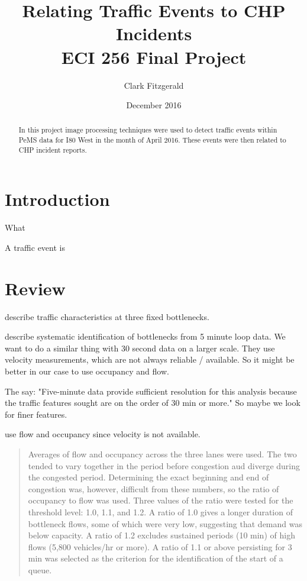 \documentclass[12pt]{article}
\begin{document}
\title{Relating Traffic Events to CHP Incidents\\
ECI 256 Final Project}
\date{December 2016}
\author{Clark Fitzgerald}
\maketitle

\begin{abstract}

In this project image processing techniques were used to detect traffic
events within PeMS data for I80 West in the month of April 2016. 
These events were then related to CHP incident reports.

\end{abstract}

\section{Introduction}

What 

A traffic event is 

\section{Review}

\cite{chung2007relation} describe traffic characteristics at three fixed bottlenecks.

\cite{chen2004systematic} describe systematic identification of bottlenecks from 5
minute loop data. We want to do a similar thing with 30 second data on a larger scale.
They use velocity measurements, which are not always reliable / available. So it might be 
better in our case to use occupancy and flow.

The say: "Five-minute data provide sufficient
resolution for this analysis because the traffic features sought are on
the order of 30 min or more." So maybe we look for finer features.

\cite{hall1991freeway} use flow and occupancy since velocity is not available.

\begin{quote}
Averages of flow and occupancy across the three lanes were
used. The two tended to vary together in the period before
congestion aud diverge during the congested period. Determining
the exact beginning and end of congestion was,
however, difficult from these numbers, so the ratio of occupancy
to flow was used. Three values of the ratio were tested
for the threshold level: 1.0, 1.1, and 1.2. A ratio of 1.0 gives
a longer duration of bottleneck flows, some of which were
very low, suggesting that demand was below capacity. A ratio
of 1.2 excludes sustained periods (10 min) of high flows (5,800
vehicles/hr or more). A ratio of 1.1 or above persisting for 3
min was selected as the criterion for the identification of the
start of a queue. 
\end{quote}
\end{document}
